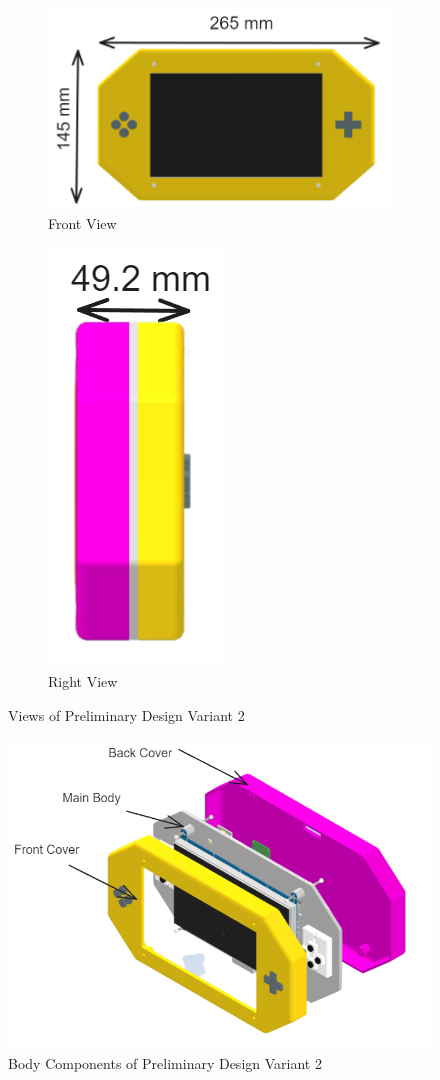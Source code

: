 \begin{figure}[h!]
    \centering
    \begin{subfigure}[c]{0.65\textwidth}
        \begin{minipage}{\textwidth}
            \centering
            \includegraphics[height=4 cm]{texs/Part1/chapter4/image/v22.png}
        \end{minipage}
        \caption{Front View}
        \label{fig:variant2_front_view}
    \end{subfigure}
    \begin{subfigure}[c]{0.25\textwidth}
        \begin{minipage}{\textwidth}
            \centering
            \includegraphics[height=4 cm]{texs/Part1/chapter4/image/v23.png}
        \end{minipage}
        \caption{Right View}
        \label{fig:variant2_right_view}
    \end{subfigure}
    \caption{Views of Preliminary Design Variant 2}
    \label{fig:variant2_views}
\end{figure}

\begin{figure}[h!]
    \centering
    \includegraphics[width=0.5\linewidth]{texs/Part1/chapter4/image/v24.png}
    \caption{Body Components of Preliminary Design Variant 2}
    \label{fig:variant2_body_components}
\end{figure}


